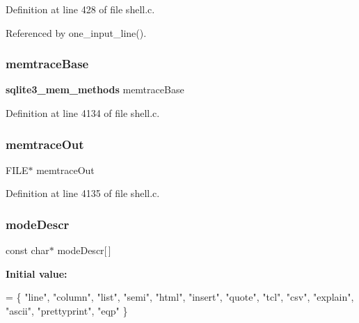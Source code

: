 Definition at line 428 of file shell.\+c.



Referenced by one\+\_\+input\+\_\+line().

\mbox{\label{shell_8c_a3a4cae0972043e05c14f6a46e374b321}} 
\subsubsection{memtrace\+Base}
{\footnotesize\ttfamily \textbf{ sqlite3\+\_\+mem\+\_\+methods} memtrace\+Base\hspace{0.3cm}{\ttfamily [static]}}



Definition at line 4134 of file shell.\+c.

\mbox{\label{shell_8c_a288e005115dbb6a86d3b5f837bbfe7d1}} 
\subsubsection{memtrace\+Out}
{\footnotesize\ttfamily F\+I\+LE$\ast$ memtrace\+Out\hspace{0.3cm}{\ttfamily [static]}}



Definition at line 4135 of file shell.\+c.

\mbox{\label{shell_8c_a583998c48830f321a47a17572f2dc933}} 
\subsubsection{mode\+Descr}
{\footnotesize\ttfamily const char$\ast$ mode\+Descr[$\,$]\hspace{0.3cm}{\ttfamily [static]}}

{\bfseries Initial value\+:}
\begin{DoxyCode}
= \{
  \textcolor{stringliteral}{"line"},
  \textcolor{stringliteral}{"column"},
  \textcolor{stringliteral}{"list"},
  \textcolor{stringliteral}{"semi"},
  \textcolor{stringliteral}{"html"},
  \textcolor{stringliteral}{"insert"},
  \textcolor{stringliteral}{"quote"},
  \textcolor{stringliteral}{"tcl"},
  \textcolor{stringliteral}{"csv"},
  \textcolor{stringliteral}{"explain"},
  \textcolor{stringliteral}{"ascii"},
  \textcolor{stringliteral}{"prettyprint"},
  \textcolor{stringliteral}{"eqp"}
\}
\end{DoxyCode}


